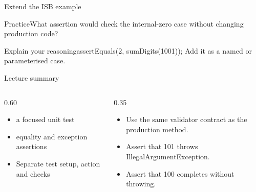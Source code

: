 \documentclass[10pt,aspectratio=169]{beamer}
\begin{document}
\begin{frame}[fragile,t]{Extend the ISB example}
\begin{alertblock}{Practice}What assertion would check the internal{-}zero case without changing production code?\end{alertblock}\vspace{3mm}\begin{exampleblock}{Explain your reasoning}assertEquals(2, sumDigits(1001)); Add it as a named or parameterised case.\end{exampleblock}
\end{frame}
\begin{frame}[fragile,t]{Lecture summary}
\begin{columns}[T,onlytextwidth]\begin{column}{0.60\textwidth}
\begin{itemize}
\item a focused unit test
\item equality and exception assertions
\item Separate test setup, action and checks
\end{itemize}
\end{column}\begin{column}{0.35\textwidth}\small
\begin{itemize}
\item Use the same validator contract as the production method.
\item Assert that 101 throws IllegalArgumentException.
\item Assert that 100 completes without throwing.
\end{itemize}
\end{column}\end{columns}
\end{frame}
\end{document}
